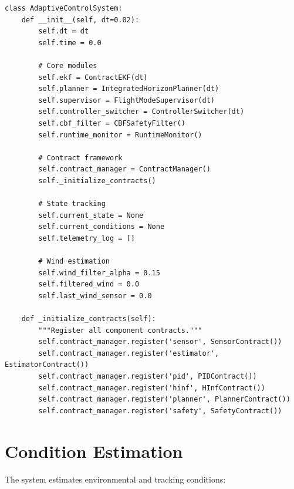 \begin{lstlisting}[caption={AdaptiveControlSystem initialization}]
class AdaptiveControlSystem:
    def __init__(self, dt=0.02):
        self.dt = dt
        self.time = 0.0

        # Core modules
        self.ekf = ContractEKF(dt)
        self.planner = IntegratedHorizonPlanner(dt)
        self.supervisor = FlightModeSupervisor(dt)
        self.controller_switcher = ControllerSwitcher(dt)
        self.cbf_filter = CBFSafetyFilter()
        self.runtime_monitor = RuntimeMonitor()

        # Contract framework
        self.contract_manager = ContractManager()
        self._initialize_contracts()

        # State tracking
        self.current_state = None
        self.current_conditions = None
        self.telemetry_log = []

        # Wind estimation
        self.wind_filter_alpha = 0.15
        self.filtered_wind = 0.0
        self.last_wind_sensor = 0.0

    def _initialize_contracts(self):
        """Register all component contracts."""
        self.contract_manager.register('sensor', SensorContract())
        self.contract_manager.register('estimator', EstimatorContract())
        self.contract_manager.register('pid', PIDContract())
        self.contract_manager.register('hinf', HInfContract())
        self.contract_manager.register('planner', PlannerContract())
        self.contract_manager.register('safety', SafetyContract())
\end{lstlisting}

\section{Condition Estimation}

The system estimates environmental and tracking conditions:

